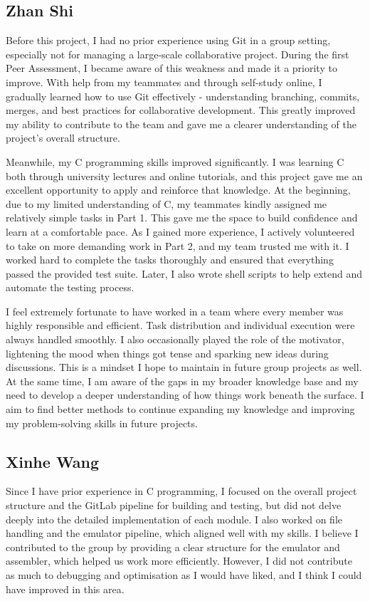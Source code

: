 \documentclass[9pt,a4paper]{article}
\begin{document}
\subsection{Zhan Shi}

Before this project, I had no prior experience using Git in a group setting, especially not for managing a large-scale collaborative project.
During the first Peer Assessment, I became aware of this weakness and made it a priority to improve.
With help from my teammates and through self-study online, I gradually learned how to use Git effectively - understanding branching, commits, merges, and best practices for collaborative development.
This greatly improved my ability to contribute to the team and gave me a clearer understanding of the project's overall structure.

Meanwhile, my C programming skills improved significantly. I was learning C both through university lectures and online tutorials, and this project gave me an excellent opportunity to apply and reinforce that knowledge.
At the beginning, due to my limited understanding of C, my teammates kindly assigned me relatively simple tasks in Part 1.
This gave me the space to build confidence and learn at a comfortable pace. As I gained more experience, I actively volunteered to take on more demanding work in Part 2, and my team trusted me with it.
I worked hard to complete the tasks thoroughly and ensured that everything passed the provided test suite. Later, I also wrote shell scripts to help extend and automate the testing process.

I feel extremely fortunate to have worked in a team where every member was highly responsible and efficient.
Task distribution and individual execution were always handled smoothly. I also occasionally played the role of the motivator, lightening the mood when things got tense and sparking new ideas during discussions.
This is a mindset I hope to maintain in future group projects as well. At the same time, I am aware of the gaps in my broader knowledge base and my need to develop a deeper understanding of how things work beneath the surface.
I aim to find better methods to continue expanding my knowledge and improving my problem-solving skills in future projects.

\subsection{Xinhe Wang}

Since I have prior experience in C programming, I focused on the overall project structure and the GitLab pipeline for building and testing, but did not delve deeply into the detailed implementation of each module.
I also worked on file handling and the emulator pipeline, which aligned well with my skills. I believe I contributed to the group by providing a clear structure for the emulator and assembler, which helped us work more efficiently.
However, I did not contribute as much to debugging and optimisation as I would have liked, and I think I could have improved in this area.
\end{document}
